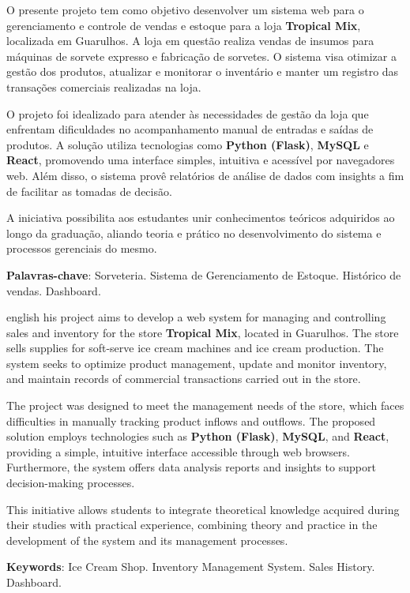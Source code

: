 \begin{resumo}
O presente projeto tem como objetivo desenvolver um sistema web para o gerenciamento e controle de vendas e estoque para a loja \textbf{Tropical Mix}, localizada em Guarulhos. A loja em questão realiza vendas de insumos para máquinas de sorvete expresso e fabricação de sorvetes. O sistema visa otimizar a gestão dos produtos, atualizar e monitorar o inventário e manter um registro das transações comerciais realizadas na loja. 

O projeto foi idealizado para atender às necessidades de gestão da loja que enfrentam dificuldades no acompanhamento manual de entradas e saídas de produtos. A solução utiliza tecnologias como \textbf{Python (Flask)}, \textbf{MySQL} e \textbf{React}, promovendo uma interface simples, intuitiva e acessível por navegadores web. Além disso, o sistema provê relatórios de análise de dados com insights a fim de facilitar as tomadas de decisão.

A iniciativa possibilita aos estudantes unir conhecimentos teóricos adquiridos ao longo da graduação, aliando teoria e prático no desenvolvimento do sistema e processos gerenciais do mesmo.

\vspace{\onelineskip}

\noindent
\textbf{Palavras-chave}: Sorveteria. Sistema de Gerenciamento de Estoque. Histórico de vendas. Dashboard.
\end{resumo}

\begin{resumo}[Abstract]
\begin{otherlanguage*}{english}
his project aims to develop a web system for managing and controlling sales and inventory for the store \textbf{Tropical Mix}, located in Guarulhos. The store sells supplies for soft-serve ice cream machines and ice cream production. The system seeks to optimize product management, update and monitor inventory, and maintain records of commercial transactions carried out in the store.

The project was designed to meet the management needs of the store, which faces difficulties in manually tracking product inflows and outflows. The proposed solution employs technologies such as \textbf{Python (Flask)}, \textbf{MySQL}, and \textbf{React}, providing a simple, intuitive interface accessible through web browsers. Furthermore, the system offers data analysis reports and insights to support decision-making processes.

This initiative allows students to integrate theoretical knowledge acquired during their studies with practical experience, combining theory and practice in the development of the system and its management processes.

\vspace{\onelineskip}

\noindent
\textbf{Keywords}: Ice Cream Shop. Inventory Management System. Sales History. Dashboard.
\end{otherlanguage*}
\end{resumo}

